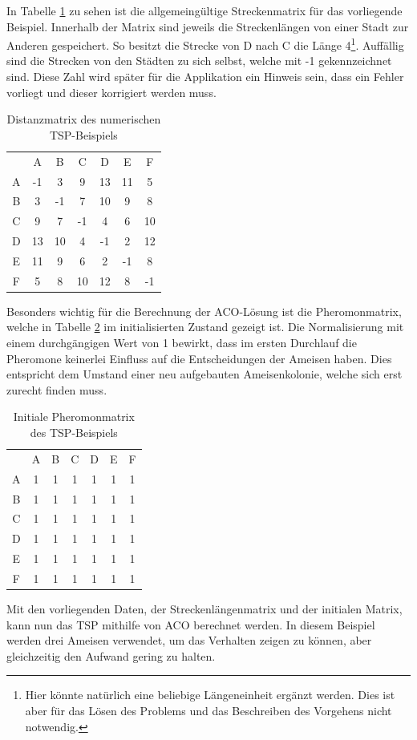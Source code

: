 	In Tabelle \ref{tspAcoNumerisch_matrix} zu sehen ist die allgemeingültige Streckenmatrix für das vorliegende Beispiel. Innerhalb der Matrix sind jeweils die Streckenlängen von einer Stadt zur Anderen gespeichert. So besitzt die Strecke von D nach C die Länge 4\footnote{Hier könnte natürlich eine beliebige Längeneinheit ergänzt werden. Dies ist aber für das Lösen des Problems und das Beschreiben des Vorgehens nicht notwendig.}. Auffällig sind die Strecken von den Städten zu sich selbst, welche mit -1 gekennzeichnet sind. Diese Zahl wird später für die Applikation ein Hinweis sein, dass ein Fehler vorliegt und dieser korrigiert werden muss.
	\begin{table}[h]
		\centering
		\footnotesize
		\begin{tabular}{c c c c c c c}
			  & A & B & C & D & E & F \\
			A & -1 & 3 & 9 & 13 & 11 & 5\\ 
			B & 3 & -1 & 7 & 10 & 9 & 8\\ 
			C & 9 & 7 & -1 & 4 & 6 & 10\\
			D & 13 & 10 & 4 & -1 & 2 & 12\\
			E & 11 & 9 & 6 & 2 & -1 & 8\\
			F & 5 & 8 & 10 & 12 & 8 & -1\\
		\end{tabular}
		\caption{Distanzmatrix des numerischen \ac{TSP}-Beispiels}
		\label{tspAcoNumerisch_matrix}
	\end{table}
	Besonders wichtig für die Berechnung der \ac{ACO}-Lösung ist die Pheromonmatrix, welche in Tabelle \ref{tspAcoNumerisch_pheromon_initial} im initialisierten Zustand gezeigt ist. Die Normalisierung mit einem durchgängigen Wert von 1 bewirkt, dass im ersten Durchlauf die Pheromone keinerlei Einfluss auf die Entscheidungen der Ameisen haben. Dies entspricht dem Umstand einer neu aufgebauten Ameisenkolonie, welche sich erst zurecht finden muss.	
	\begin{table}[h]
		\centering
		\footnotesize
		\begin{tabular}{c c c c c c c}
			& A & B & C & D & E & F \\
			A & 1 & 1 & 1 & 1 & 1 & 1\\ 
			B & 1 & 1 & 1 & 1 & 1 & 1\\ 
			C & 1 & 1 & 1 & 1 & 1 & 1\\
			D & 1 & 1 & 1 & 1 & 1 & 1\\
			E & 1 & 1 & 1 & 1 & 1 & 1\\
			F & 1 & 1 & 1 & 1 & 1 & 1\\
		\end{tabular}
		\caption{Initiale Pheromonmatrix des \ac{TSP}-Beispiels}
		\label{tspAcoNumerisch_pheromon_initial}
	\end{table}
	Mit den vorliegenden Daten, der Streckenlängenmatrix und der initialen Matrix, kann nun das \ac{TSP} mithilfe von \ac{ACO} berechnet werden. In diesem Beispiel werden drei Ameisen verwendet, um das Verhalten zeigen zu können, aber gleichzeitig den Aufwand gering zu halten.
	
